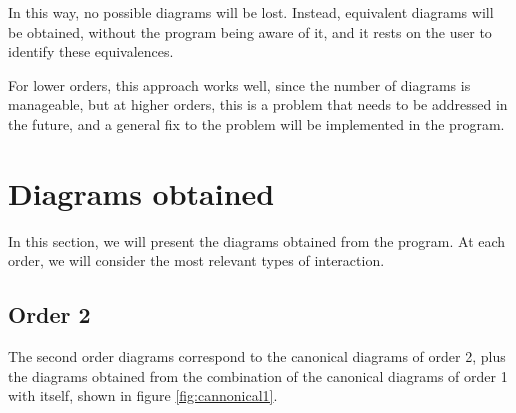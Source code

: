 \documentclass[11pt,a4paper,twoside,pdf]{article}
\numberwithin{equation}{section}
\begin{document}
In this way, no possible diagrams will be lost. Instead, equivalent diagrams will be 
obtained, without the program being aware of it, and it rests on the user to
identify these equivalences. 

For lower orders, this approach works well, since the number of diagrams is
manageable, but at higher orders, this is a problem that needs to be addressed in 
the future, and a general fix to the problem will be implemented in the program.

\newpage

\section{Diagrams obtained} \label{sec:diagrams}

In this section, we will present the diagrams obtained from the program. At 
each order, we will consider the most relevant types of interaction.

\subsection{Order 2}
The second order diagrams correspond to the canonical diagrams of order 2,
plus the diagrams obtained from the combination of the canonical diagrams of order 1 with 
itself, shown in figure \ref{fig:cannonical1}.
\end{document}

